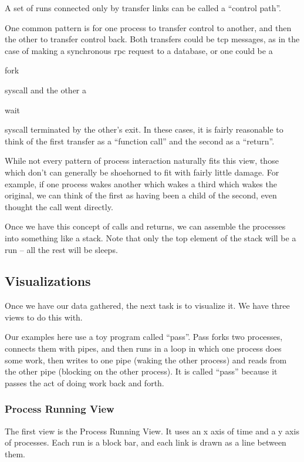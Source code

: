 \documentclass[10pt]{article}
\begin{document}
A set of runs connected only by transfer links can be called a ``control path''.

One common pattern is for one process to transfer control to another, and then the other to transfer control back.  Both transfers could be tcp messages, as in the case of making a synchronous rpc request to a database, or one could be a \begin{tt}fork\end{tt} syscall and the other a \begin{tt}wait\end{tt} syscall terminated by the other's exit.  In these cases, it is fairly reasonable to think of the first transfer as a ``function call'' and the second as a ``return''.

While not every pattern of process interaction naturally fits this view, those which don't can generally be shoehorned to fit with fairly little damage.  For example, if one process wakes another which wakes a third which wakes the original, we can think of the first as having been a child of the second, even thought the call went directly.

Once we have this concept of calls and returns, we can assemble the processes into something like a stack.  Note that only the top element of the stack will be a run -- all the rest will be sleeps.

\subsection{Visualizations}

Once we have our data gathered, the next task is to visualize it.  We have three views to do this with.

Our examples here use a toy program called ``pass''.  Pass forks two processes, connects them with pipes, and then runs in a loop in which one process does some work, then writes to one pipe (waking the other process) and reads from the other pipe (blocking on the other process).  It is called ``pass'' because it passes the act of doing work back and forth.

\subsubsection{Process Running View}

The first view is the Process Running View.  It uses an x axis of time and a y axis of processes.  Each run is a block bar, and each link is drawn as a line between them.
\end{document}
